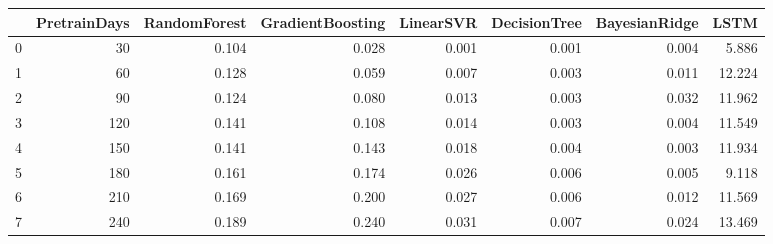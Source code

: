 \begin{tabular}{lrrrrrrr}
\toprule
{} &  PretrainDays &  RandomForest &  GradientBoosting &  LinearSVR &  DecisionTree &  BayesianRidge &   LSTM \\
\midrule
0 &            30 &         0.104 &             0.028 &      0.001 &         0.001 &          0.004 &  5.886 \\
1 &            60 &         0.128 &             0.059 &      0.007 &         0.003 &          0.011 & 12.224 \\
2 &            90 &         0.124 &             0.080 &      0.013 &         0.003 &          0.032 & 11.962 \\
3 &           120 &         0.141 &             0.108 &      0.014 &         0.003 &          0.004 & 11.549 \\
4 &           150 &         0.141 &             0.143 &      0.018 &         0.004 &          0.003 & 11.934 \\
5 &           180 &         0.161 &             0.174 &      0.026 &         0.006 &          0.005 &  9.118 \\
6 &           210 &         0.169 &             0.200 &      0.027 &         0.006 &          0.012 & 11.569 \\
7 &           240 &         0.189 &             0.240 &      0.031 &         0.007 &          0.024 & 13.469 \\
\bottomrule
\end{tabular}
